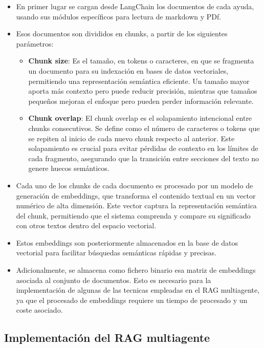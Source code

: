 \begin{itemize}
    \item En primer lugar se cargan desde LangChain los documentos de cada ayuda, usando sus módulos específicos para lectura de markdown y PDf.
    \item Esos documentos son divididos en chunks, a partir de los siguientes parámetros:
    
    \begin{itemize}
            \item \textbf{Chunk size}: Es el tamaño, en tokens o caracteres, en que se fragmenta un documento para su indexación en bases de datos vectoriales, permitiendo una representación semántica eficiente. 
            Un tamaño mayor aporta más contexto pero puede reducir precisión, mientras que tamaños pequeños mejoran el enfoque pero pueden perder información relevante.
            \item \textbf{Chunk overlap}: El chunk overlap es el solapamiento intencional entre chunks consecutivos. Se define como el número de caracteres o tokens que se repiten al inicio de cada nuevo chunk respecto al anterior. 
            Este solapamiento es crucial para evitar pérdidas de contexto en los límites de cada fragmento, asegurando que la transición entre secciones del texto no genere huecos semánticos.
        \end{itemize}
    
    \item Cada uno de los chunks de cada documento es procesado por un modelo de generación de embeddings, que transforma el contenido textual en un vector numérico de alta dimensión. 
    Este vector captura la representación semántica del chunk, permitiendo que el sistema comprenda y compare su significado con otros textos dentro del espacio vectorial.  
    \item Estos embeddings son posteriormente almacenados en la base de datos vectorial para facilitar búsquedas semánticas rápidas y precisas.
    \item Adicionalmente, se almacena como fichero binario esa matriz de embeddings asociada al conjunto de documentos. 
    Esto es necesario para la implementación de algunas de las tecnicas empleadas en el RAG multiagente, ya que el procesado de embeddings requiere un tiempo de procesado y un coste asociado.

\end{itemize}


\subsection{Implementación del RAG multiagente}

